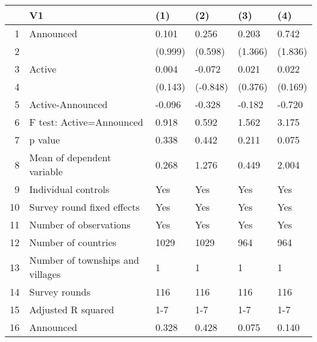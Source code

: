 \begin{table}[ht]
\centering
\begin{tabular}{rlllll}
  \hline
 & V1 & (1) & (2) & (3) & (4) \\ 
  \hline
1 & Announced & 0.101 & 0.256 & 0.203 & 0.742 \\ 
  2 &  & (0.999) & (0.598) & (1.366) & (1.836) \\ 
  3 & Active & 0.004 & -0.072 & 0.021 & 0.022 \\ 
  4 &  & (0.143) & (-0.848) & (0.376) & (0.169) \\ 
  5 & Active-Announced & -0.096 & -0.328 & -0.182 & -0.720 \\ 
  6 & F test: Active=Announced & 0.918 & 0.592 & 1.562 & 3.175 \\ 
  7 & p value & 0.338 & 0.442 & 0.211 & 0.075 \\ 
  8 & Mean of dependent variable & 0.268 & 1.276 & 0.449 & 2.004 \\ 
  9 & Individual controls & Yes & Yes & Yes & Yes \\ 
  10 & Survey round fixed effects & Yes & Yes & Yes & Yes \\ 
  11 & Number of observations & Yes & Yes & Yes & Yes \\ 
  12 & Number of countries & 1029 & 1029 & 964 & 964 \\ 
  13 & Number of townships and villages & 1 & 1 & 1 & 1 \\ 
  14 & Survey rounds & 116 & 116 & 116 & 116 \\ 
  15 & Adjusted R squared & 1-7 & 1-7 & 1-7 & 1-7 \\ 
  16 & Announced & 0.328 & 0.428 & 0.075 & 0.140 \\ 
   \hline
\end{tabular}
\end{table}
